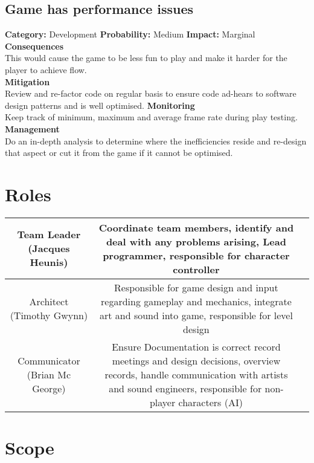 \documentclass[a4paper,10pt]{article}
\begin{document}
\subsection{Game has performance issues}
\textbf{Category:} Development\newline
\textbf{Probability:} Medium\newline
\textbf{Impact:} Marginal
\\\textbf{Consequences}\\
This would cause the game to be less fun to play and make it harder for the player to achieve flow.
\smallskip\\\textbf{Mitigation}\\
Review and re-factor code on regular basis to ensure code ad-hears to software design patterns and is well optimised.
\smallskip\textbf{Monitoring}\\
Keep track of minimum, maximum and average frame rate during play testing.
\smallskip\\\textbf{Management}\\
Do an in-depth analysis to determine where the inefficiencies reside and re-design that aspect or cut it from the game if it cannot be optimised.

\section{Roles}
\begin{center}
	\begin{tabular}{|c|c|p{10cm}}
			\hline
		Team Leader (Jacques Heunis) &\parbox{9cm}{ Coordinate team members, identify and deal with any problems arising, Lead programmer, responsible for character controller}\\
		\hline
		Architect (Timothy Gwynn) &\parbox{9cm}{ Responsible for game design and input regarding gameplay and mechanics, integrate art and sound into game, responsible for level design}\\
		\hline
		Communicator (Brian Mc George) & \parbox{9cm}{Ensure Documentation is correct  record meetings and design decisions, overview records, handle communication with artists and sound engineers, responsible for non-player characters (AI)}\\
		\hline
	\end{tabular}
\end{center}
\section{Scope}
\end{document}
